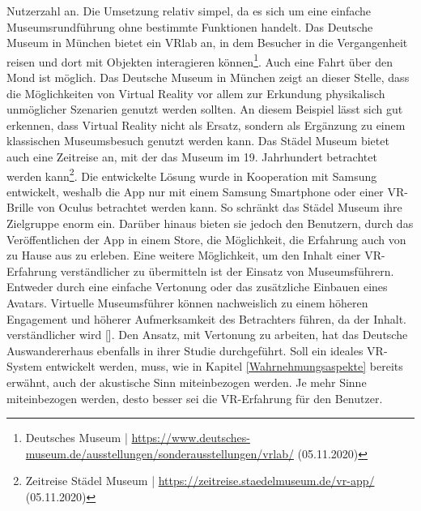 \documentclass[a4paper,12pt,oneside]{article}
\begin{document}
        Nutzerzahl an.
        Die Umsetzung relativ simpel, da es sich um eine einfache Museumsrundführung
        ohne bestimmte Funktionen handelt.
        Das Deutsche Museum in München bietet ein VRlab an, in dem Besucher in die Vergangenheit
        reisen und dort mit Objekten interagieren können\footnote{Deutsches Museum | \url{https://www.deutsches-museum.de/ausstellungen/sonderausstellungen/vrlab/} (05.11.2020)}.
        Auch eine Fahrt über den Mond ist möglich. Das Deutsche Museum in München 
        zeigt an dieser Stelle,
        dass die Möglichkeiten von Virtual Reality vor allem zur Erkundung physikalisch unmöglicher
        Szenarien genutzt werden sollten. An 
        diesem Beispiel lässt sich gut erkennen, dass Virtual Reality nicht als Ersatz, sondern
        als Ergänzung zu einem klassischen Museumsbesuch genutzt werden kann.
        Das Städel Museum bietet auch eine Zeitreise an, mit der das Museum im 19. Jahrhundert
        betrachtet werden kann\footnote{Zeitreise Städel Museum | \url{https://zeitreise.staedelmuseum.de/vr-app/} (05.11.2020)}.
        Die entwickelte Lösung wurde in Kooperation mit Samsung entwickelt, weshalb die App
        nur mit einem Samsung Smartphone oder einer VR-Brille von Oculus betrachtet werden
        kann. So schränkt das Städel Museum ihre Zielgruppe enorm ein. 
        Darüber hinaus bieten sie jedoch den Benutzern, durch das Veröffentlichen der App
        in einem Store, die Möglichkeit, die Erfahrung auch von zu Hause aus zu erleben.
        Eine weitere Möglichkeit, um den Inhalt einer VR-Erfahrung verständlicher zu übermitteln
        ist der Einsatz von Museumsführern. Entweder durch eine einfache Vertonung 
        oder das zusätzliche Einbauen eines Avatars. 
        Virtuelle Museumsführer können nachweislich zu einem höheren
        Engagement und höherer Aufmerksamkeit des Betrachters führen, da der Inhalt.
        verständlicher wird [\cite[299-300]{Carrozzino2018}].
        Den Ansatz, mit Vertonung zu arbeiten, hat das Deutsche Auswandererhaus ebenfalls in
        ihrer Studie durchgeführt.
        Soll ein ideales VR-System entwickelt werden, muss, wie in Kapitel \ref{Wahrnehmungsaspekte}
        bereits erwähnt, auch der akustische Sinn miteinbezogen werden. Je mehr Sinne miteinbezogen
        werden, desto besser sei die VR-Erfahrung für den Benutzer.
\end{document}

